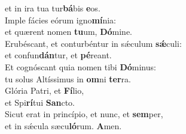 \evenverse et in ira tua tur\textbf{bá}bis \textbf{e}os.\\
\oddverse Imple fácies eórum igno\textbf{mí}nia:~\*\\
\oddverse et quærent nomen \textbf{tu}um, \textbf{Dó}mine.\\
\evenverse Erubéscant, et conturbéntur in sǽculum \textbf{sǽ}culi:~\*\\
\evenverse et confun\textbf{dán}tur, et \textbf{pé}reant.\\
\oddverse Et cognóscant quia nomen tibi \textbf{Dó}minus:~\*\\
\oddverse tu solus Altíssimus in \textbf{om}ni \textbf{ter}ra.\\
\evenverse Glória Patri, et \textbf{Fí}lio,~\*\\
\evenverse et Spi\textbf{rí}tui \textbf{San}cto.\\
\oddverse Sicut erat in princípio, et nunc, et \textbf{sem}per,~\*\\
\oddverse et in sǽcula sæcu\textbf{ló}rum. \textbf{A}men.\\
